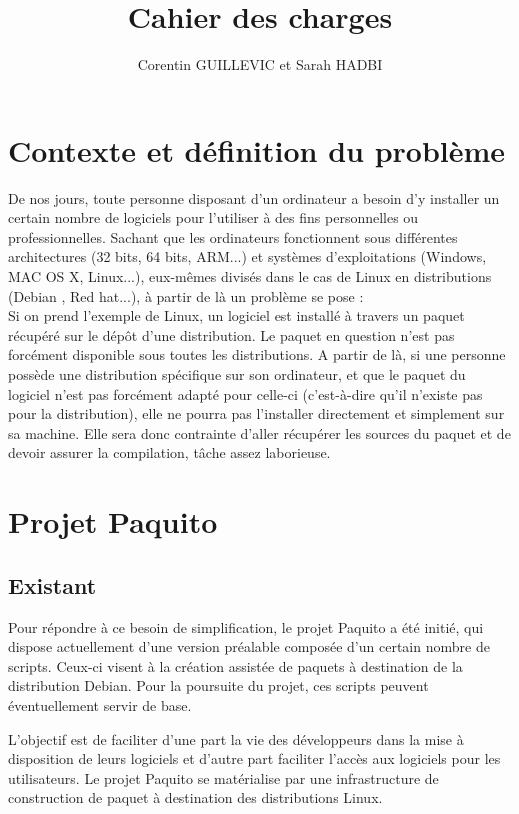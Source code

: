\documentclass[12pt,a4paper]{article}
\title{Cahier des charges}
\author{Corentin GUILLEVIC et Sarah HADBI}
\begin{document}
\maketitle

\section{Contexte et définition du problème}

De nos jours, toute personne disposant d'un ordinateur a besoin d'y installer un certain nombre de logiciels pour l'utiliser à des fins personnelles ou professionnelles. Sachant que les ordinateurs fonctionnent sous différentes architectures (32 bits, 64 bits, ARM...) et systèmes d'exploitations (Windows, MAC OS X, Linux...), eux-mêmes divisés dans le cas de Linux en distributions (Debian , Red hat...), à partir de là un problème se pose :
\\

Si on prend l'exemple de Linux, un logiciel est installé à travers un paquet récupéré sur le dépôt d'une distribution. Le paquet en question n'est pas forcément disponible sous toutes les distributions. A partir de là, si une personne possède une distribution spécifique sur son ordinateur, et que le paquet du logiciel n'est pas forcément adapté pour celle-ci (c'est-à-dire qu'il n'existe pas pour la distribution), elle ne pourra pas l'installer directement et simplement sur sa machine. Elle sera donc contrainte d'aller récupérer les sources du paquet et de devoir assurer la compilation, tâche assez laborieuse.

\section{Projet Paquito}
\subsection{Existant}
Pour répondre à ce besoin de simplification, le projet Paquito a été initié, qui dispose actuellement d'une version préalable composée d'un certain nombre de scripts. Ceux-ci visent à la création assistée de paquets à destination de la distribution Debian. Pour la poursuite du projet, ces scripts peuvent éventuellement servir de base.

L'objectif est de faciliter d'une part la vie des développeurs dans la mise à disposition de leurs logiciels et d'autre part faciliter l'accès aux logiciels pour les utilisateurs. Le projet Paquito se matérialise par une infrastructure de construction de paquet à destination des distributions Linux.
	
\end{document}
